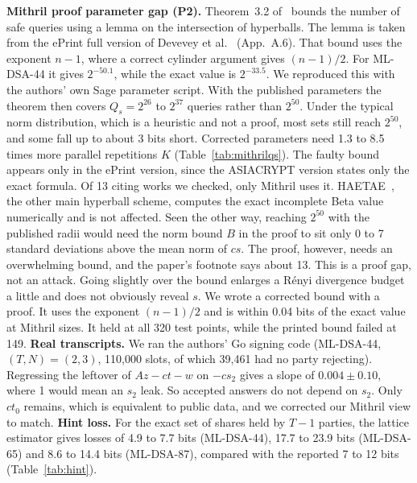 \documentclass[10pt,conference,a4paper]{IEEEtran}
\begin{document}
\textbf{Mithril proof parameter gap (P2).} Theorem~3.2 of~\cite{mithril} bounds the number of safe queries using a lemma on
the intersection of hyperballs. The lemma is taken from the ePrint full version of Devevey et al.~\cite{devevey}
(App.~A.6). That bound uses the exponent $n-1$, where a correct cylinder argument gives $(n-1)/2$. For ML-DSA-44 it gives
$2^{-50.1}$, while the exact value is $2^{-33.5}$. We reproduced this with the authors' own Sage parameter script. With the
published parameters the theorem then covers $Q_s=2^{26}$ to $2^{37}$ queries rather than $2^{50}$. Under the typical norm
distribution, which is a heuristic and not a proof, most sets still reach $2^{50}$, and some fall up to about 3 bits short.
Corrected parameters need 1.3 to 8.5 times more parallel repetitions $K$ (Table~\ref{tab:mithrilqs}). The faulty bound
appears only in the ePrint version, since the ASIACRYPT version states only the exact formula. Of 13 citing works we
checked, only Mithril uses it. HAETAE~\cite{haetae}, the other main hyperball scheme, computes the exact incomplete Beta
value numerically and is not affected. Seen the other way, reaching $2^{50}$ with the published radii would need the norm
bound $B$ in the proof to sit only 0 to 7 standard deviations above the mean norm of $cs$. The proof, however, needs an
overwhelming bound, and the paper's footnote says about 13. This is a proof gap, not an attack. Going slightly over the
bound enlarges a R\'enyi divergence budget a little and does not obviously reveal $s$. We wrote a corrected bound with a
proof. It uses the exponent $(n-1)/2$ and is within 0.04 bits of the exact value at Mithril sizes. It held at all 320 test
points, while the printed bound failed at 149. \textbf{Real transcripts.} We ran the authors' Go signing code (ML-DSA-44,
$(T,N)=(2,3)$, 110{,}000 slots, of which 39{,}461 had no party rejecting). Regressing the leftover of $Az-ct-w$ on $-cs_2$
gives a slope of $0.004\pm0.10$, where 1 would mean an $s_2$ leak. So accepted answers do not depend on $s_2$. Only $ct_0$
remains, which is equivalent to public data, and we corrected our Mithril view to match. \textbf{Hint loss.} For the exact
set of shares held by $T-1$ parties, the lattice estimator gives losses of 4.9 to 7.7 bits (ML-DSA-44), 17.7 to 23.9 bits
(ML-DSA-65) and 8.6 to 14.4 bits (ML-DSA-87), compared with the reported 7 to 12 bits (Table~\ref{tab:hint}).
\end{document}
